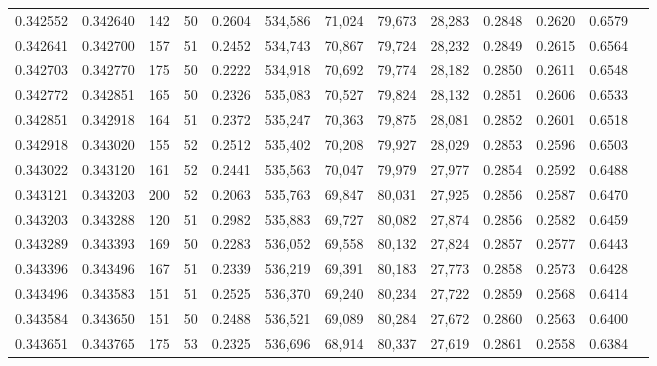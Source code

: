 \begin{tabular}{rrrrrrrrrrrrr}
0.342552 & 0.342640 &   142 &  50 &                                     0.2604 & 534,586 &  71,024 &  79,673 &  28,283 & 0.2848 & 0.2620 & 0.6579 \\
0.342641 & 0.342700 &   157 &  51 &                                     0.2452 & 534,743 &  70,867 &  79,724 &  28,232 & 0.2849 & 0.2615 & 0.6564 \\
0.342703 & 0.342770 &   175 &  50 &                                     0.2222 & 534,918 &  70,692 &  79,774 &  28,182 & 0.2850 & 0.2611 & 0.6548 \\
0.342772 & 0.342851 &   165 &  50 &                                     0.2326 & 535,083 &  70,527 &  79,824 &  28,132 & 0.2851 & 0.2606 & 0.6533 \\
0.342851 & 0.342918 &   164 &  51 &                                     0.2372 & 535,247 &  70,363 &  79,875 &  28,081 & 0.2852 & 0.2601 & 0.6518 \\
0.342918 & 0.343020 &   155 &  52 &                                     0.2512 & 535,402 &  70,208 &  79,927 &  28,029 & 0.2853 & 0.2596 & 0.6503 \\
0.343022 & 0.343120 &   161 &  52 &                                     0.2441 & 535,563 &  70,047 &  79,979 &  27,977 & 0.2854 & 0.2592 & 0.6488 \\
0.343121 & 0.343203 &   200 &  52 &                                     0.2063 & 535,763 &  69,847 &  80,031 &  27,925 & 0.2856 & 0.2587 & 0.6470 \\
0.343203 & 0.343288 &   120 &  51 &                                     0.2982 & 535,883 &  69,727 &  80,082 &  27,874 & 0.2856 & 0.2582 & 0.6459 \\
0.343289 & 0.343393 &   169 &  50 &                                     0.2283 & 536,052 &  69,558 &  80,132 &  27,824 & 0.2857 & 0.2577 & 0.6443 \\
0.343396 & 0.343496 &   167 &  51 &                                     0.2339 & 536,219 &  69,391 &  80,183 &  27,773 & 0.2858 & 0.2573 & 0.6428 \\
0.343496 & 0.343583 &   151 &  51 &                                     0.2525 & 536,370 &  69,240 &  80,234 &  27,722 & 0.2859 & 0.2568 & 0.6414 \\
0.343584 & 0.343650 &   151 &  50 &                                     0.2488 & 536,521 &  69,089 &  80,284 &  27,672 & 0.2860 & 0.2563 & 0.6400 \\
0.343651 & 0.343765 &   175 &  53 &                                     0.2325 & 536,696 &  68,914 &  80,337 &  27,619 & 0.2861 & 0.2558 & 0.6384 \\

\end{tabular}
